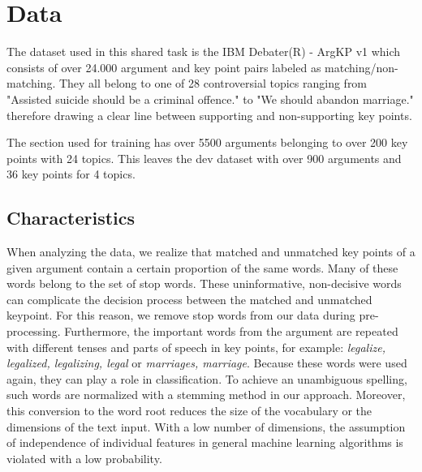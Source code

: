 \section{Data}\label{data}

The dataset used in this shared task is the IBM Debater(R) - ArgKP v1 \cite{Bar-HaimEFKLS2020} which consists of over 
24.000 argument and key point pairs labeled as matching/non-matching.
They all belong to one of 28 controversial topics ranging from "Assisted suicide should be a criminal offence." to 
"We should abandon marriage." therefore drawing a clear line between supporting and non-supporting key points.

The section used for training has over 5500 arguments belonging to over 200 key points with 24 topics. This leaves the 
dev dataset with over 900 arguments and 36 key points for 4 topics.

\subsection{Characteristics}

When analyzing the data, we realize that matched and unmatched key points of a given argument contain a certain proportion of the same words. Many of these words belong to the set of stop words. These uninformative, non-decisive words can complicate the decision process between the matched and unmatched keypoint. For this reason, we remove stop words from our data during pre-processing. Furthermore, the important words from the argument are repeated with different tenses and parts of speech in key points, for example: \textit{legalize, legalized, legalizing, legal} or \textit{marriages, marriage}. Because these words were used again, they can play a role in classification. To achieve an unambiguous spelling, such words are normalized with a stemming method in our approach. Moreover, this conversion to the word root reduces the size of the vocabulary or the dimensions of the text input. With a low number of dimensions, the assumption of independence of individual features in general machine learning algorithms is violated with a low probability. 


